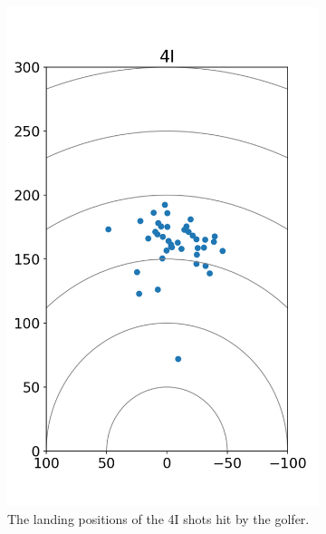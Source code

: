 \documentclass{kththesis}
\begin{document}
\begin{figure}
\begin{subfigure}{0.4\textwidth}
    \includegraphics[height=0.4\textheight]{Shots/4I_shots.png} 
    \caption{The landing positions of the 4I shots hit by the golfer.}
    \label{fig:4I_shots}
    \end{subfigure}
    \begin{subfigure}{0.4\textwidth}
    \centering

\end{subfigure}
\end{figure}
\end{document}
